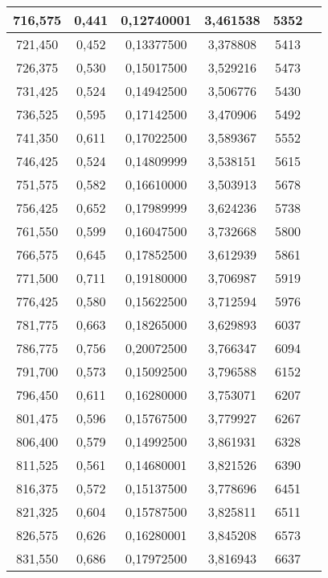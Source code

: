 \documentclass[a4paper,12pt]{article}
\numberwithin{equation}{section}
\begin{document}
\begin{appendices}
\begin{longtable}[c]{|c|c|c|c|c|c|}
716,575	&	 		0,441	&	 		0,12740001		 	&	3,461538	&	 		5352		\\\hline
721,450	&	 		0,452	&	 		0,13377500		 	&	3,378808	&	 		5413		\\\hline
726,375	&	 		0,530	&	 		0,15017500		 	&	3,529216	&	 		5473		\\\hline
731,425	&	 		0,524	&	 		0,14942500		 	&	3,506776	&	 		5430		\\\hline
736,525	&	 		0,595	&	 		0,17142500		 	&	3,470906	&	 		5492		\\\hline
741,350	&	 		0,611	&	 		0,17022500		 	&	3,589367	&	 		5552		\\\hline
746,425	&	 		0,524	&	 		0,14809999		 	&	3,538151	&	 		5615		\\\hline
751,575	&	 		0,582	&	 		0,16610000		 	&	3,503913	&	 		5678		\\\hline
756,425	&	 		0,652	&	 		0,17989999		 	&	3,624236	&	 		5738		\\\hline
761,550	&	 		0,599	&	 		0,16047500		 	&	3,732668	&	 		5800		\\\hline
766,575	&	 		0,645	&	 		0,17852500		 	&	3,612939	&	 		5861		\\\hline
771,500	&	 		0,711	&	 		0,19180000		 	&	3,706987	&	 		5919		\\\hline
776,425	&	 		0,580	&	 		0,15622500		 	&	3,712594	&	 		5976		\\\hline
781,775	&	 		0,663	&	 		0,18265000		 	&	3,629893	&	 		6037		\\\hline
786,775	&	 		0,756	&	 		0,20072500		 	&	3,766347	&	 		6094		\\\hline
791,700	&	 		0,573	&	 		0,15092500		 	&	3,796588	&	 		6152		\\\hline
796,450	&	 		0,611	&	 		0,16280000		 	&	3,753071	&	 		6207		\\\hline
801,475	&	 		0,596	&	 		0,15767500		 	&	3,779927	&	 		6267		\\\hline
806,400	&	 		0,579	&	 		0,14992500		 	&	3,861931	&	 		6328		\\\hline
811,525	&	 		0,561	&	 		0,14680001		 	&	3,821526	&	 		6390		\\\hline
816,375	&	 		0,572	&	 		0,15137500		 	&	3,778696	&	 		6451		\\\hline
821,325	&	 		0,604	&	 		0,15787500		 	&	3,825811	&	 		6511		\\\hline
826,575	&	 		0,626	&	 		0,16280001		 	&	3,845208	&	 		6573		\\\hline
831,550	&	 		0,686	&	 		0,17972500		 	&	3,816943	&	 		6637		\\\hline

\end{longtable}
\end{appendices}
\end{document}
